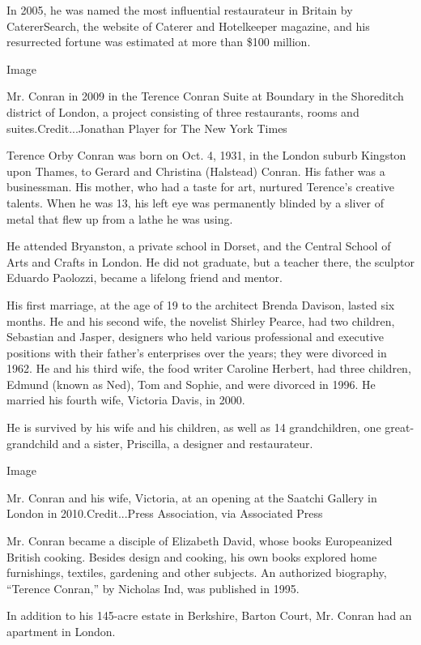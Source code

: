 In 2005, he was named the most influential restaurateur in Britain by
CatererSearch, the website of Caterer and Hotelkeeper magazine, and his
resurrected fortune was estimated at more than \$100 million.

Image

Mr. Conran in 2009 in the Terence Conran Suite at Boundary in the
Shoreditch district of London, a project consisting of three
restaurants, rooms and suites.Credit...Jonathan Player for The New York
Times

Terence Orby Conran was born on Oct. 4, 1931, in the London suburb
Kingston upon Thames, to Gerard and Christina (Halstead) Conran. His
father was a businessman. His mother, who had a taste for art, nurtured
Terence's creative talents. When he was 13, his left eye was permanently
blinded by a sliver of metal that flew up from a lathe he was using.

He attended Bryanston, a private school in Dorset, and the Central
School of Arts and Crafts in London. He did not graduate, but a teacher
there, the sculptor Eduardo Paolozzi, became a lifelong friend and
mentor.

His first marriage, at the age of 19 to the architect Brenda Davison,
lasted six months. He and his second wife, the novelist Shirley Pearce,
had two children, Sebastian and Jasper, designers who held various
professional and executive positions with their father's enterprises
over the years; they were divorced in 1962. He and his third wife, the
food writer Caroline Herbert, had three children, Edmund (known as Ned),
Tom and Sophie, and were divorced in 1996. He married his fourth wife,
Victoria Davis, in 2000.

He is survived by his wife and his children, as well as 14
grandchildren, one great-grandchild and a sister, Priscilla, a designer
and restaurateur.

Image

Mr. Conran and his wife, Victoria, at an opening at the Saatchi Gallery
in London in 2010.Credit...Press Association, via Associated Press

Mr. Conran became a disciple of Elizabeth David, whose books
Europeanized British cooking. Besides design and cooking, his own books
explored home furnishings, textiles, gardening and other subjects. An
authorized biography, ``Terence Conran,'' by Nicholas Ind, was published
in 1995.

In addition to his 145-acre estate in Berkshire, Barton Court, Mr.
Conran had an apartment in London.

